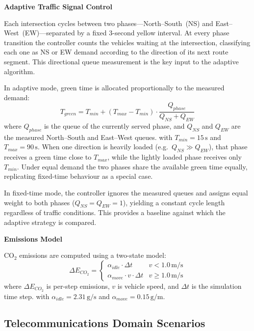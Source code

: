\medskip\noindent\textbf{Adaptive Traffic Signal Control}

Each intersection cycles between two phases—North–South~(NS) and East–West~(EW)—separated by a fixed 3-second yellow interval. At every phase transition the controller counts the vehicles waiting at the intersection, classifying each one as NS or EW demand according to the direction of its next route segment. This directional queue measurement is the key input to the adaptive algorithm.

In adaptive mode, green time is allocated proportionally to the measured demand:
\begin{equation}
T_{green} = T_{min} + (T_{max} - T_{min}) \cdot \frac{Q_{phase}}{Q_{NS} + Q_{EW}}
\label{eq:adaptive_signal}
\end{equation}
where $Q_{phase}$ is the queue of the currently served phase, and $Q_{NS}$ and $Q_{EW}$ are the measured North--South and East--West queues.
with $T_{min} = 15\,\text{s}$ and $T_{max} = 90\,\text{s}$. When one direction is heavily loaded (e.g.\ $Q_{NS} \gg Q_{EW}$), that phase receives a green time close to $T_{max}$, while the lightly loaded phase receives only $T_{min}$. Under equal demand the two phases share the available green time equally, replicating fixed-time behaviour as a special case.

In fixed-time mode, the controller ignores the measured queues and assigns equal weight to both phases ($Q_{NS} = Q_{EW} = 1$), yielding a constant cycle length regardless of traffic conditions. This provides a baseline against which the adaptive strategy is compared.

\medskip\noindent\textbf{Emissions Model}

CO$_2$ emissions are computed using a two-state model:
\begin{equation}
\Delta E_{CO_2} =
\begin{cases}
\alpha_{idle} \cdot \Delta t & v < 1.0\,\text{m/s} \\
\alpha_{move} \cdot v \cdot \Delta t & v \geq 1.0\,\text{m/s}
\end{cases}
\label{eq:emissions}
\end{equation}
where $\Delta E_{CO_2}$ is per-step emissions, $v$ is vehicle speed, and $\Delta t$ is the simulation time step.
with $\alpha_{idle} = 2.31\,\text{g/s}$ and $\alpha_{move} = 0.15\,\text{g/m}$.


\subsection{Telecommunications Domain Scenarios}

